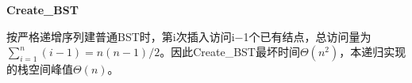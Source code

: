 {\color{ink}\bfseries Create\_BST}\par\vspace{1bp}按严格递增序列建普通BST时，第i次插入访问i\(-\)1个已有结点，总访问量为\(\sum_{i=\allowbreak{}1}^{n}(i-1)=\allowbreak{}n(n-1)/\allowbreak{}2\)。因此Create\_BST最坏时间\(\Theta (n^{2})\)，本递归实现的栈空间峰值\(\Theta (n)\)。
